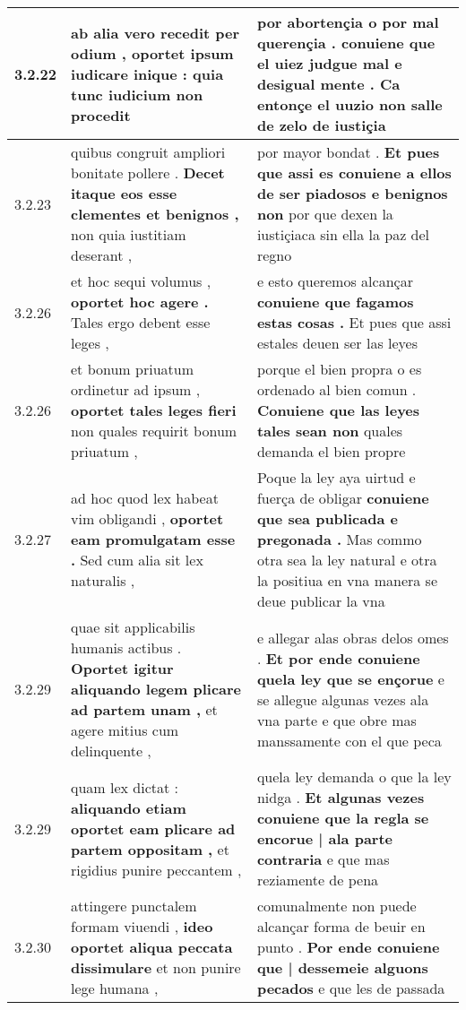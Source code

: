 \begin{tabular}{|p{1cm}|p{6.5cm}|p{6.5cm}|}
3.2.22 & ab alia vero recedit per odium , \textbf{ oportet ipsum iudicare inique : } quia tunc iudicium non procedit & por abortençia o por mal querençia . \textbf{ conuiene que el uiez judgue mal e desigual mente . } Ca entonçe el uuzio non salle de zelo de iustiçia \\\hline
3.2.23 & quibus congruit ampliori bonitate pollere . \textbf{ Decet itaque eos esse clementes et benignos , } non quia iustitiam deserant , & por mayor bondat . \textbf{ Et pues que assi es conuiene a ellos de ser piadosos e benignos non } por que dexen la iustiçiaca sin ella la paz del regno \\\hline
3.2.26 & et hoc sequi volumus , \textbf{ oportet hoc agere . } Tales ergo debent esse leges , & e esto queremos alcançar \textbf{ conuiene que fagamos estas cosas . } Et pues que assi estales deuen ser las leyes \\\hline
3.2.26 & et bonum priuatum ordinetur ad ipsum , \textbf{ oportet tales leges fieri } non quales requirit bonum priuatum , & porque el bien propra o es ordenado al bien comun . \textbf{ Conuiene que las leyes tales sean non } quales demanda el bien propre \\\hline
3.2.27 & ad hoc quod lex habeat vim obligandi , \textbf{ oportet eam promulgatam esse . } Sed cum alia sit lex naturalis , & Poque la ley aya uirtud e fuerça de obligar \textbf{ conuiene que sea publicada e pregonada . } Mas commo otra sea la ley natural e otra la positiua en vna manera se deue publicar la vna \\\hline
3.2.29 & quae sit applicabilis humanis actibus . \textbf{ Oportet igitur aliquando legem plicare ad partem unam , } et agere mitius cum delinquente , & e allegar alas obras delos omes . \textbf{ Et por ende conuiene quela ley que se ençorue } e se allegue algunas vezes ala vna parte e que obre mas manssamente con el que peca \\\hline
3.2.29 & quam lex dictat : \textbf{ aliquando etiam oportet eam plicare ad partem oppositam , } et rigidius punire peccantem , & quela ley demanda o que la ley nidga . \textbf{ Et algunas vezes conuiene que la regla se encorue | ala parte contraria } e que mas reziamente de pena \\\hline
3.2.30 & attingere punctalem formam viuendi , \textbf{ ideo oportet aliqua peccata dissimulare } et non punire lege humana , & comunalmente non puede alcançar forma de beuir en punto . \textbf{ Por ende conuiene que | dessemeie alguons pecados } e que les de passada \\\hline

\end{tabular}

